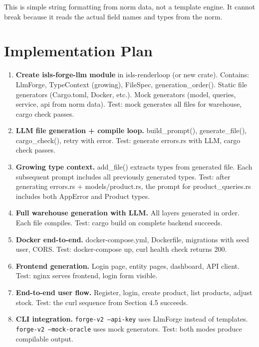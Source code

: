 \documentclass[11pt,a4paper]{article}
\begin{document}
This is simple string formatting from norm data, not a template
engine. It cannot break because it reads the actual field names
and types from the norm.

\section{Implementation Plan}

\begin{enumerate}
\item \textbf{Create isls-forge-llm module} in isls-renderloop (or new crate).
  Contains: LlmForge, TypeContext (growing), FileSpec, generation\_order().
  Static file generators (Cargo.toml, Docker, etc.).
  Mock generators (model, queries, service, api from norm data).
  Test: mock generates all files for warehouse, cargo check passes.

\item \textbf{LLM file generation + compile loop.}
  build\_prompt(), generate\_file(), cargo\_check(), retry with error.
  Test: generate errors.rs with LLM, cargo check passes.

\item \textbf{Growing type context.}
  add\_file() extracts types from generated file.
  Each subsequent prompt includes all previously generated types.
  Test: after generating errors.rs + models/product.rs, the prompt
  for product\_queries.rs includes both AppError and Product types.

\item \textbf{Full warehouse generation with LLM.}
  All layers generated in order. Each file compiles.
  Test: cargo build on complete backend succeeds.

\item \textbf{Docker end-to-end.}
  docker-compose.yml, Dockerfile, migrations with seed user, CORS.
  Test: docker-compose up, curl health check returns 200.

\item \textbf{Frontend generation.}
  Login page, entity pages, dashboard, API client.
  Test: nginx serves frontend, login form visible.

\item \textbf{End-to-end user flow.}
  Register, login, create product, list products, adjust stock.
  Test: the curl sequence from Section 4.5 succeeds.

\item \textbf{CLI integration.}
  \texttt{forge-v2 --api-key} uses LlmForge instead of templates.
  \texttt{forge-v2 --mock-oracle} uses mock generators.
  Test: both modes produce compilable output.
\end{enumerate}
\end{document}
